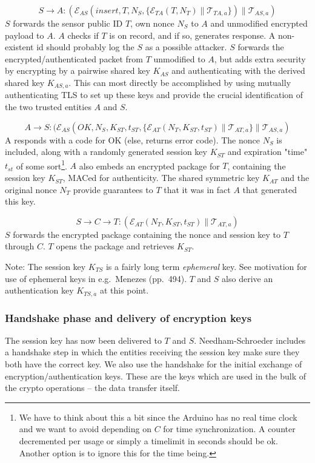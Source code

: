 \[
S \rightarrow A: (\mathcal{E}_{AS}(insert,T,N_S, \{ \mathcal{E}_{TA}(T,N_T) \parallel \mathcal{T}_{TA,a} \}) \parallel \mathcal{T}_{AS,a})
\]
$S$ forwards the sensor public ID $T$, own nonce $N_S$ to $A$ and unmodified encrypted payload to $A$. $A$ checks if $T$ is on record, and if so, generates response. A non-existent id should probably log the $S$ as a possible attacker. 
%
$S$ forwards the encrypted/authenticated packet from $T$ unmodified to $A$, but adds extra security by encrypting by a pairwise shared key $K_{AS}$ and authenticating with the derived shared key $K_{AS,a}$. This can most directly be accomplished by using mutually authenticating TLS to set up these keys and provide the crucial identification of the two trusted entities $A$ and $S$.

\[
A \rightarrow S: (\mathcal{E}_{AS}(OK,N_S,K_{ST},t_{ST}, \{ \mathcal{E}_{AT}(N_T,K_{ST},t_{ST}) \parallel \mathcal{T}_{AT,a} \} \parallel \mathcal{T}_{AS,a})
\]
A responds with a code for OK (else, returns error code). The nonce $N_S$ is included, along with a randomly generated session key $K_{ST}$ and expiration "time" $t_{st}$ of some sort\footnote{We have to think about this a bit since the Arduino has no real time clock and we want to avoid depending on $C$ for time synchronization. A counter decremented per usage or simply a timelimit in seconds should be ok. Another option is to ignore this for the time being.}. $A$ also embeds an encrypted package for $T$, containing the session key $K_{ST}$, MACed for authenticity. The shared symmetric key $K_{AT}$ and the original nonce $N_T$ provide guarantees to $T$ that it was in fact $A$ that generated this key.

\[
S \rightarrow C \rightarrow T: (\mathcal{E}_{AT}(N_T,K_{ST},t_{ST}) \parallel \mathcal{T}_{AT,a})
\]
$S$ forwards the encrypted package containing the nonce and session key to $T$ through $C$. $T$ opens the package and retrieves $K_{ST}$. 

Note: The session key $K_{TS}$ is a fairly long term \textit{ephemeral} key. See motivation for use of ephemeral keys in e.g.\ Menezes (pp.\ 494). $T$ and $S$ also derive an authentication key $K_{TS,a}$ at this point.

\subsubsection{Handshake phase and delivery of encryption keys}

The session key has now been delivered to $T$ and $S$. Needham-Schroeder includes a handshake step in which the entities receiving the session key make sure they both have the correct key. We also use the handshake for the initial exchange of encryption/authentication keys. These are the keys which are used in the bulk of the crypto operations -- the data transfer itself.


